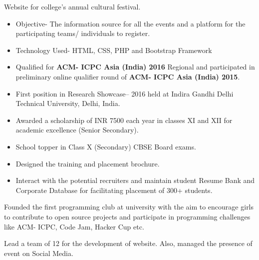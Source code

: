 \documentclass[9.5pt,a4paper]{altacv}
\begin{document}
\divider

Website for college’s annual cultural festival.
\begin{itemize}
\item Objective- The information source for all the events and a platform for the participating teams/ individuals to register. 
\item Technology Used- HTML, CSS, PHP and Bootstrap Framework
\end{itemize}


\begin{itemize}
\item Qualified for \textbf{ACM- ICPC Asia (India) 2016} Regional and participated in preliminary online qualifier round of \textbf{ACM- ICPC Asia (India) 2015}.
\item First position in Research Showcase– 2016 held at Indira Gandhi Delhi Technical University, Delhi, India.  
\item Awarded a scholarship of INR 7500  each year in classes XI and XII for academic excellence (Senior Secondary).
\item School topper in Class X (Secondary) CBSE Board exams.
\end{itemize}


\begin{itemize}
\item Designed the training and placement brochure.
\item Interact with the potential recruiters and maintain student Resume Bank and Corporate Database for facilitating placement of 300+ students.
\end{itemize}

Founded the first programming club at university with the aim to encourage girls to contribute to open source projects and participate in programming challenges like ACM- ICPC, Code Jam, Hacker Cup etc.

Lead a team of 12 for the development of website. Also, managed the presence of event on Social Media.
\end{document}
